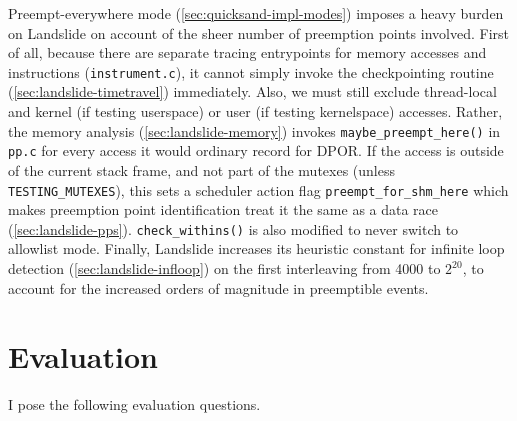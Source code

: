 Preempt-everywhere mode (\cref{sec:quicksand-impl-modes})
imposes a heavy burden on Landslide on account of the sheer number of preemption points involved.
First of all, because there are separate tracing entrypoints for memory accesses and instructions ({\tt instrument.c}),
it cannot simply invoke the checkpointing routine (\cref{sec:landslide-timetravel}) immediately.
Also, we must still exclude thread-local and kernel (if testing userspace) or user (if testing kernelspace) accesses.
Rather,
the memory analysis (\cref{sec:landslide-memory}) invokes
{\tt maybe\_preempt\_here()} in {\tt pp.c}
for every access it would ordinary record for DPOR.
If the access is outside of the current stack frame,
and not part of the mutexes (unless {\tt TESTING\_MUTEXES}),
this sets a scheduler action flag {\tt preempt\_for\_shm\_here}
which makes preemption point identification treat it the same as a data race (\cref{sec:landslide-pps}).
{\tt check\_withins()} is also modified to never switch to allowlist mode.
Finally,
Landslide increases its heuristic constant for infinite loop detection (\cref{sec:landslide-infloop})
on the first interleaving from 4000 to $2^{20}$,
to account for the increased orders of magnitude in preemptible events.


\section{Evaluation}
\label{sec:quicksand-eval}


I pose the following evaluation questions.

